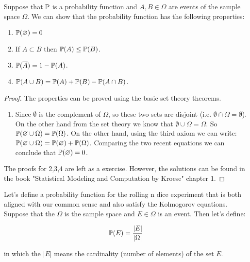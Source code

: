 \begin{theorem}
	
	Suppose that $\mathbb{P}$ is a probability function and $A,B \in \Omega$ are events of the sample space $\Omega$. We can show that the probability function has the following properties:
	
	\begin{enumerate}
		
		\item $\mathbb{P}(\varnothing) = 0$
		
		\item If $A \subset B$ then $\mathbb{P}(A) \leq \mathbb{P}(B)$.
		
		\item $\mathbb{P}(\overline{A}) = 1 - \mathbb{P}(A)$.
		
		\item $\mathbb{P}(A \cup B) = \mathbb{P}(A) + \mathbb{P}(B) - \mathbb{P}(A \cap B)$.
		
	\end{enumerate}
	
\end{theorem}


\begin{proof}
	The properties can be proved using the basic set theory theorems.
	
	\begin{enumerate}
		
		\item Since $\emptyset$ is the complement of $\Omega$, so these two sets are disjoint (i.e. $\emptyset \cap \Omega = \emptyset$). On the other hand from the set theory we know that $\emptyset \cup \Omega = \Omega$. So $\mathbb{P}(\varnothing \cup \Omega) = \mathbb{P}(\Omega)$. On the other hand, using the third axiom we can write: $\mathbb{P}(\varnothing \cup \Omega) = \mathbb{P}(\varnothing) + \mathbb{P}(\Omega)$. Comparing the two recent equations we can conclude that $\mathbb{P}(\varnothing) = 0$.
		
		
		
	\end{enumerate}
	
	
	
	The proofs for 2,3,4 are left as a exercise. However, the solutions can be found in the book "Statistical Modeling and Computation by Kroese" chapter 1. 
	
	
\end{proof}



\begin{example}
	
	Let's define a probability function for the rolling n dice experiment that is both aligned with our common sense and also satisfy the Kolmogorov equations. Suppose that the $\Omega$ is the sample space and $E \in \Omega$ is an event. Then let's define:
	
	$$\mathbb{P}(E) = \frac{\lvert E \rvert}{\lvert \Omega \rvert}$$
	
	in which the $\lvert E \rvert$ means the cardinality (number of elements) of the set $E$.
	
\end{example}

